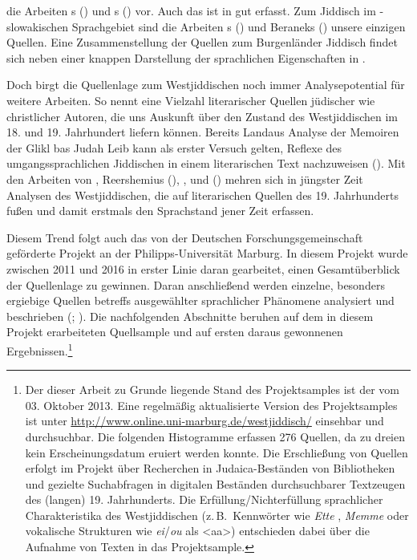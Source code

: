   die Arbeiten \citeauthor{Hutterer1965}s (\citeyear{Hutterer1965,Hutterer1994}) und \citeauthor{Garvin1965}s (\citeyear{Garvin1965}) vor. Auch das  ist in \cite{Herzog1965} gut erfasst. Zum Jiddisch im -slowakischen Sprachgebiet sind die Arbeiten \citeauthor{Trost1965}s (\citeyear{Trost1965}) und Beraneks (\citeyear{Beranek1936,Beranek1949}) unsere einzigen Quellen. Eine Zusammenstellung der Quellen zum Burgenländer Jiddisch findet sich neben einer knappen Darstellung der sprachlichen Eigenschaften in \textcite{Schaefer2017}.

Doch birgt die Quellenlage zum Westjiddischen noch immer Analysepotential für weitere Arbeiten. So nennt \cite{Weinreich1953} eine Vielzahl literarischer Quellen jüdischer wie christlicher Autoren, die uns Auskunft über den Zustand des Westjiddischen im 18. und 19. Jahrhundert liefern können. Bereits Landaus Analyse der Memoiren der Glikl bas Judah Leib kann als erster Versuch gelten, Reflexe des umgangssprachlichen Jiddischen in einem literarischen Text nachzuweisen (\citealt{Landau1901}). Mit den Arbeiten von \cite{AptrootGruschka2004}, Reershemius (\citeyear{Reershemius2007,Reershemius2014}), \cite{Weisskirchen2011}, \cite{FleischerSchaefer2012} und \citeauthor{Schaefer2008} (\citeyear{Schaefer2008,Schaefer2010,Schaefer2013,Schaefer2014}) mehren sich in jüngster Zeit Analysen des Westjiddischen, die auf literarischen Quellen des 19. Jahrhunderts fußen und damit erstmals den Sprachstand jener Zeit erfassen.

Diesem Trend folgt auch das von der Deutschen Forschungsgemeinschaft geförderte Projekt  an der Philipps-Universität Marburg. In diesem Projekt wurde zwischen 2011 und 2016 in erster Linie daran gearbeitet, einen Gesamtüberblick der Quellenlage zu gewinnen. Daran anschließend werden einzelne, besonders ergiebige Quellen betreffs ausgewählter sprachlicher Phänomene analysiert und beschrieben (\citealt{Weisskirchen2011,Schaefer2013,Schaefer2014}{; }\citealt{FleischerSchaefer2012}). Die nachfolgenden Abschnitte beruhen auf dem in diesem Projekt erarbeiteten Quellsample und auf ersten daraus gewonnenen Ergebnissen.\footnote{Der dieser Arbeit zu Grunde liegende Stand des Projektsamples ist der vom 03. Oktober 2013. Eine regelmäßig aktualisierte Version des Projektsamples ist unter \url{http://www.online.uni-marburg.de/westjiddisch/} einsehbar und durchsuchbar. Die folgenden Histogramme erfassen 276 Quellen, da zu dreien kein Erscheinungsdatum eruiert werden konnte. Die Erschließung von Quellen erfolgt im Projekt über Recherchen in Judaica-Beständen von Bibliotheken und gezielte Suchabfragen in digitalen Beständen durchsuchbarer Textzeugen des (langen) 19. Jahrhunderts. Die Erfüllung/Nichterfüllung sprachlicher Charakteristika des Westjiddischen (z.\,B.\, Kennwörter wie \textit{Ette} , \textit{Memme}  oder vokalische Strukturen wie {\mhd} \textit{ei}/\textit{ou} als <aa>) entschieden dabei über die Aufnahme von Texten in das Projektsample.}

